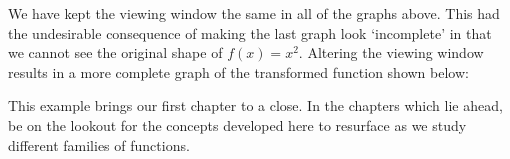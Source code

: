 \medskip

We have kept the viewing window the same in all of the graphs above.  This had the undesirable consequence of making the last graph look `incomplete' in that we cannot see the original shape of $f(x) = x^{2}$.  Altering the viewing window results in a more complete graph of the transformed function shown below:
\begin{center}
\end{center}

\smallskip

This example brings our first chapter to a close.  In the chapters which lie ahead, be on the lookout for the concepts developed here to resurface as we study different families of functions.  

